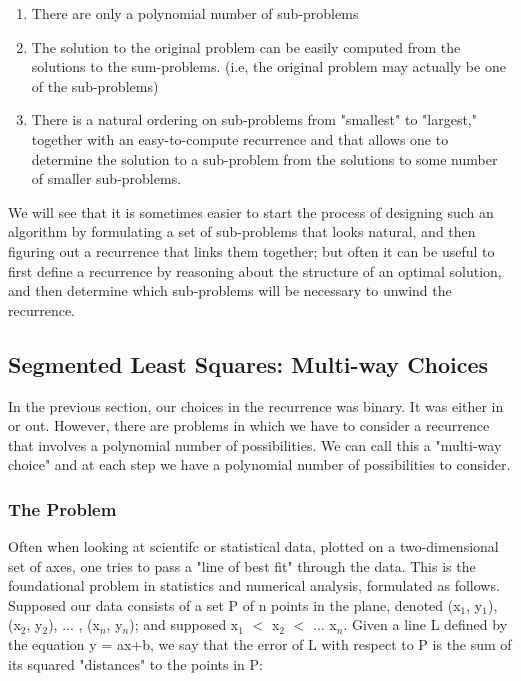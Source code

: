 \documentclass{article}
\begin{document}
\begin{enumerate}
    \item There are only a polynomial number of sub-problems
    \item The solution to the original problem can be easily computed from the solutions to the sum-problems. (i.e, the original problem may actually be one of the sub-problems)
    \item There is a natural ordering on sub-problems from "smallest" to "largest," together with an easy-to-compute recurrence and that allows one to determine the solution to a sub-problem from the solutions to some number of smaller sub-problems.
\end{enumerate}

We will see that it is sometimes easier to start the process of designing such an algorithm by formulating a set of sub-problems that looks natural, and then figuring out a recurrence that links them together; but often it can be useful to first define a recurrence by reasoning about the structure of an optimal solution, and then determine which sub-problems will be necessary to unwind the recurrence.\\

\subsection{Segmented Least Squares: Multi-way Choices}
In the previous section, our choices in the recurrence was binary. It was either in or out. However, there are problems in which we have to consider a recurrence that involves a polynomial number of possibilities. We can call this a "multi-way choice" and at each step we have a polynomial number of possibilities to consider.\\

\subsubsection{The Problem}
Often when looking at scientifc or statistical data, plotted on a two-dimensional set of axes, one tries to pass a "line of best fit" through the data. This is the foundational problem in statistics and numerical analysis, formulated as follows.\\

Supposed our data consists of a set P of n points in the plane, denoted (x$_1$, y$_1$), (x$_2$, y$_2$), ... , (x$_n$, y$_n$); and supposed x$_1$ $<$ x$_2$ $<$ ... x$_n$. Given a line L defined by the equation y = ax+b, we say that the error of L with respect to P is the sum of its squared "distances" to the points in P:
\end{document}
